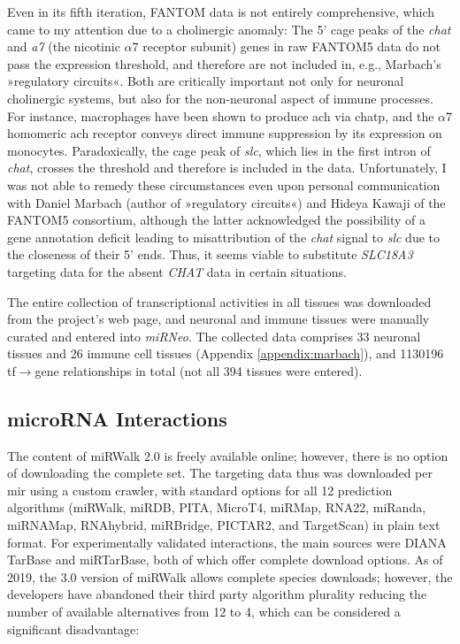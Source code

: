 Even in its fifth iteration, FANTOM data is not entirely comprehensive, which came to my attention due to a cholinergic anomaly: The 5' \ac{cage} peaks of the \textit{\ac{chat}} and \textit{\acs{a7}} (the nicotinic $\alpha$7 receptor subunit) genes in raw FANTOM5 data do not pass the expression threshold, and therefore are not included in, e.g., Marbach's »regulatory circuits«. Both are critically important not only for neuronal cholinergic systems, but also for the non-neuronal aspect of immune processes. For instance, macrophages have been shown to produce \ac{ach} via \ac{chatp}, and the $\alpha$7 homomeric \ac{ach} receptor conveys direct immune suppression by its expression on monocytes.\cite{Fujii2017} Paradoxically, the \ac{cage} peak of \textit{\ac{slc}}, which lies in the first intron of \textit{\ac{chat}}, crosses the threshold and therefore is included in the data. Unfortunately, I was not able to remedy these circumstances even upon personal communication with Daniel Marbach (author of »regulatory circuits«) and Hideya Kawaji of the FANTOM5 consortium, although the latter acknowledged the possibility of a gene annotation deficit leading to misattribution of the \textit{\ac{chat}} signal to \textit{\ac{slc}} due to the closeness of their 5' ends. Thus, it seems viable to substitute \emph{SLC18A3} targeting data for the absent \emph{CHAT} data in certain situations.

The entire collection of transcriptional activities in all tissues was downloaded from the project's web page,\cite{Marbach2016} and neuronal and immune tissues were manually curated and entered into \textit{miRNeo}. The collected data comprises 33 neuronal tissues and 26 immune cell tissues (Appendix \ref{appendix:marbach}), and \num{1130196} \ac{tf}$\to$gene relationships in total (not all 394 tissues were entered). 

\subsection{microRNA Interactions} \label{sec:database:mirna}
The content of miRWalk 2.0 is freely available online;\cite{miRWalk2} however, there is no option of downloading the complete set. The targeting data thus was downloaded per \ac{mir} using a custom crawler, with standard options for all 12 prediction algorithms (miRWalk, miRDB, PITA, MicroT4, miRMap, RNA22, miRanda, miRNAMap, RNAhybrid, miRBridge, PICTAR2, and TargetScan) in plain text format. For experimentally validated interactions, the main sources were DIANA TarBase\cite{Karagkouni2018} and miRTarBase,\cite{Chou2018} both of which offer complete download options. As of 2019, the 3.0 version of miRWalk allows complete species downloads; however, the developers have abandoned their third party algorithm plurality reducing the number of available alternatives from 12 to 4, which can be considered a significant disadvantage:

